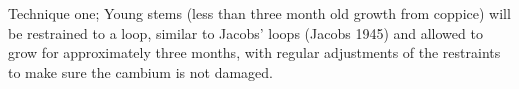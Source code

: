 Technique one; Young stems (less than three month old growth from coppice) will
be restrained to a loop, similar to Jacobs' loops (Jacobs 1945) and allowed to
grow for approximately three months, with regular adjustments of the restraints
to make sure the cambium is not damaged.